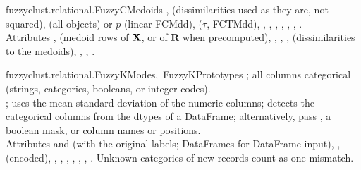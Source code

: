 \begin{apibox}{fuzzyclust.relational.FuzzyCMedoids}
,  (dissimilarities used as they are, not squared),  (all objects) or $p$ (linear FCMdd),  ($\tau$, FCTMdd), , , , , , , .\\
Attributes ,  (medoid rows of $\mathbf{X}$, or of $\mathbf{R}$ when precomputed), , , ,  (dissimilarities to the medoids), , , .
\end{apibox}

\begin{apibox}{fuzzyclust.relational.FuzzyKModes,\allowbreak\ FuzzyKPrototypes}
; all columns categorical (strings, categories, booleans, or integer codes).\\
;  uses the mean standard deviation of the numeric columns;  detects the categorical columns from the dtypes of a DataFrame; alternatively, pass , a boolean mask, or column names or positions.\\
Attributes  and  (with the original labels; DataFrames for DataFrame input), ,  (encoded), , , , , , , . Unknown categories of new records count as one mismatch.
\end{apibox}

